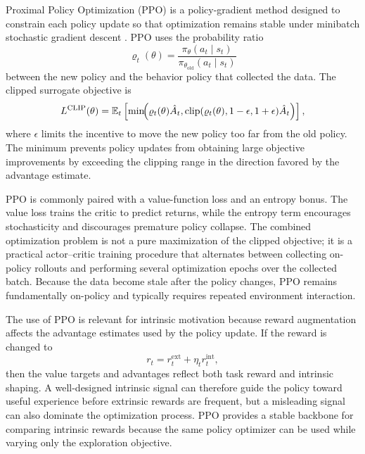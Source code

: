 Proximal Policy Optimization (PPO) is a policy-gradient method designed to constrain each policy update so that optimization remains stable under minibatch stochastic gradient descent \parencite{schulman-2017}.
PPO uses the probability ratio
\begin{equation}
    \varrho_t(\theta)=\frac{\pi_\theta(a_t\mid s_t)}{\pi_{\theta_{\mathrm{old}}}(a_t\mid s_t)}
\end{equation}
between the new policy and the behavior policy that collected the data.
The clipped surrogate objective is
\begin{equation}
    L^{\mathrm{CLIP}}(\theta)=
    \mathbb{E}_t\left[
    \min\!\Bigl(\varrho_t(\theta)\hat{A}_t,
    \mathrm{clip}(\varrho_t(\theta),1-\epsilon,1+\epsilon)\hat{A}_t
    \Bigr)
    \right],
\end{equation}
where $\epsilon$ limits the incentive to move the new policy too far from the old policy.
The minimum prevents policy updates from obtaining large objective improvements by exceeding the clipping range in the direction favored by the advantage estimate.

PPO is commonly paired with a value-function loss and an entropy bonus.
The value loss trains the critic to predict returns, while the entropy term encourages stochasticity and discourages premature policy collapse.
The combined optimization problem is not a pure maximization of the clipped objective; it is a practical actor--critic training procedure that alternates between collecting on-policy rollouts and performing several optimization epochs over the collected batch.
Because the data become stale after the policy changes, PPO remains fundamentally on-policy and typically requires repeated environment interaction.

The use of PPO is relevant for intrinsic motivation because reward augmentation affects the advantage estimates used by the policy update.
If the reward is changed to
\begin{equation}
    r_t = r_t^{\mathrm{ext}} + \eta_t r_t^{\mathrm{int}},
\end{equation}
then the value targets and advantages reflect both task reward and intrinsic shaping.
A well-designed intrinsic signal can therefore guide the policy toward useful experience before extrinsic rewards are frequent, but a misleading signal can also dominate the optimization process.
PPO provides a stable backbone for comparing intrinsic rewards because the same policy optimizer can be used while varying only the exploration objective.
